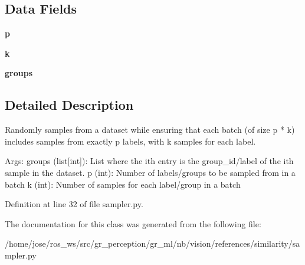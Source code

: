 \subsection*{Data Fields}
\begin{DoxyCompactItemize}
\item 
\mbox{\label{classsampler_1_1PKSampler_aea34f943bd1a00a0877437192b575d2a}} 
{\bfseries p}
\item 
\mbox{\label{classsampler_1_1PKSampler_a3128e8961582ebfcafadbdf006106ebb}} 
{\bfseries k}
\item 
\mbox{\label{classsampler_1_1PKSampler_a2606657cd5c66dc81c4a677c9ba27707}} 
{\bfseries groups}
\end{DoxyCompactItemize}


\subsection{Detailed Description}
\begin{DoxyVerb}Randomly samples from a dataset  while ensuring that each batch (of size p * k)
includes samples from exactly p labels, with k samples for each label.

Args:
    groups (list[int]): List where the ith entry is the group_id/label of the ith sample in the dataset.
    p (int): Number of labels/groups to be sampled from in a batch
    k (int): Number of samples for each label/group in a batch
\end{DoxyVerb}
 

Definition at line 32 of file sampler.\+py.



The documentation for this class was generated from the following file\+:\begin{DoxyCompactItemize}
\item 
/home/jose/ros\+\_\+ws/src/gr\+\_\+perception/gr\+\_\+ml/nb/vision/references/similarity/sampler.\+py\end{DoxyCompactItemize}
